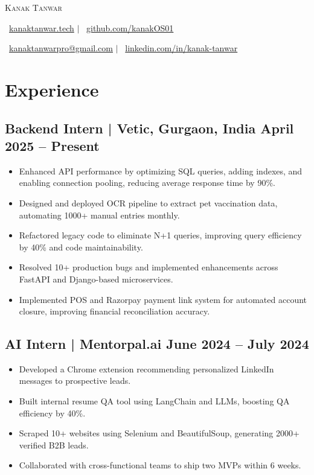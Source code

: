 \documentclass[a4paper,11pt]{article}
\begin{document}
\pagestyle{empty}

\vspace{-8mm}
\begin{center}
    {\Huge\scshape Kanak Tanwar}

    \vspace{0.01em}
    \faGlobe\ \href{https://kanaktanwar.tech}{kanaktanwar.tech} $\vert$
    \faGithub\ \href{https://github.com/kanakOS01}{github.com/kanakOS01}
    
    \faEnvelope\ \href{mailto:kanaktanwarpro@gmail.com}{kanaktanwarpro@gmail.com} $\vert$
    \faLinkedin\ \href{https://www.linkedin.com/in/kanak-tanwar/}{linkedin.com/in/kanak-tanwar}
\end{center} 
\vspace{-6mm}

\section*{Experience}
\vspace{-2mm}

\subsection{Backend Intern | Vetic, Gurgaon, India \hfill April 2025 -- Present}
\begin{itemize}[left=1pt,itemsep=1pt,topsep=0pt,parsep=0pt]
    \item Enhanced API performance by optimizing SQL queries, adding indexes, and enabling connection pooling, reducing average response time by 90\%.
    \item Designed and deployed OCR pipeline to extract pet vaccination data, automating 1000+ manual entries monthly.
    \item Refactored legacy code to eliminate N+1 queries, improving query efficiency by 40\% and code maintainability.
    \item Resolved 10+ production bugs and implemented enhancements across FastAPI and Django-based microservices.
    \item Implemented POS and Razorpay payment link system for automated account closure, improving financial reconciliation accuracy.
\end{itemize}

\subsection{AI Intern | Mentorpal.ai \hfill June 2024 -- July 2024}
\begin{itemize}[left=1pt,itemsep=1pt,topsep=0pt,parsep=0pt]
    \item Developed a Chrome extension recommending personalized LinkedIn messages to prospective leads.
    \item Built internal resume QA tool using LangChain and LLMs, boosting QA efficiency by 40\%.
    \item Scraped 10+ websites using Selenium and BeautifulSoup, generating 2000+ verified B2B leads.
    \item Collaborated with cross-functional teams to ship two MVPs within 6 weeks.
\end{itemize}
\end{document}

